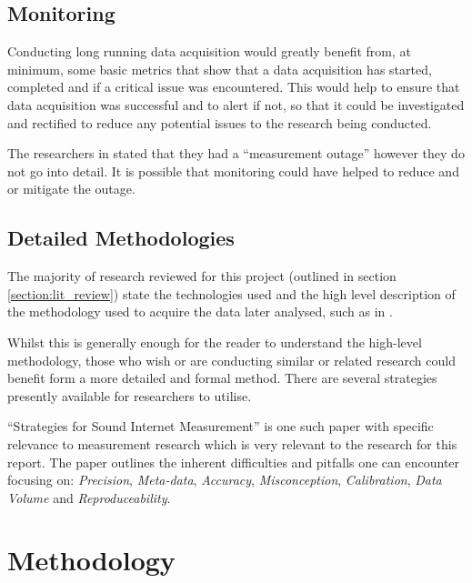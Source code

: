 \documentclass{mscreport}
\begin{document}
\subsection{Monitoring}

Conducting long running data acquisition would greatly benefit from, at minimum, some basic metrics that show that a data acquisition has started, completed and if a critical issue was encountered. This would help to ensure that data acquisition was successful and to alert if not, so that it could be investigated and rectified to reduce any potential issues to the research being conducted.

\vspace{0.3cm} \noindent
The researchers in \cite{Poteat2021-zr} stated that they had a ``measurement outage'' however they do not go into detail. It is possible that monitoring could have helped to reduce and or mitigate the outage.

\subsection{Detailed Methodologies}

The majority of research reviewed for this project (outlined in section \ref{section:lit_review}) state the technologies used and the high level description of the methodology used to acquire the data later analysed, such as in \cite{Amann2017-co,Chen2016-dl,Van_Goethem2014-ao}.

\vspace{0.3cm} \noindent
Whilst this is generally enough for the reader to understand the high-level methodology, those who wish or are conducting similar or related research could benefit form a more detailed and formal method. There are several strategies presently available for researchers to utilise.

\vspace{0.3cm} \noindent
``Strategies for Sound Internet Measurement'' \cite{Paxson2004-hq} is one such paper with specific relevance to measurement research which is very relevant to the research for this report. The paper outlines the inherent difficulties and pitfalls one can encounter focusing on: \textit{Precision}, \textit{Meta-data}, \textit{Accuracy}, \textit{Misconception}, \textit{Calibration}, \textit{Data Volume} and  \textit{Reproduceability}.


\section{Methodology}
\label{section:methodology}
\end{document}
